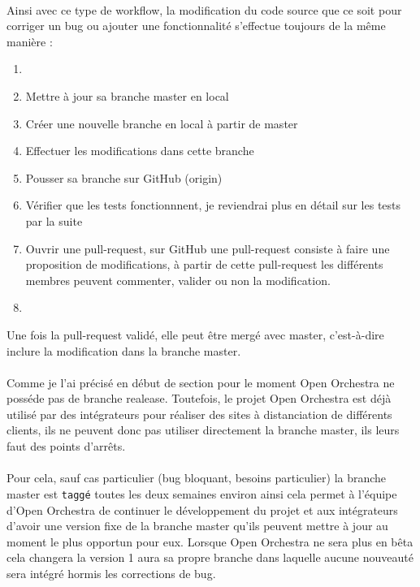 \paragraph{}
Ainsi avec ce type de workflow, la modification du code source que ce soit pour corriger un bug ou ajouter une fonctionnalité s'effectue toujours de la même manière : 
\begin{enumerate}
\item[]
\item Mettre à jour sa branche master en local
\item Créer une nouvelle branche en local à partir de master
\item Effectuer les modifications dans cette branche
\item Pousser sa branche sur GitHub (origin)
\item Vérifier que les tests fonctionnnent, je reviendrai plus en détail sur les tests par la suite
\item Ouvrir une pull-request, sur GitHub une pull-request consiste à faire une proposition de modifications, à partir de cette pull-request les différents membres peuvent commenter, valider ou non la modification.
         \item[]
\end{enumerate}

Une fois la pull-request validé, elle peut être mergé avec master, c'est-à-dire inclure la modification dans la branche master.
\paragraph{}
Comme je l'ai précisé en début de section pour le moment Open Orchestra ne posséde pas de branche realease. Toutefois, le projet Open Orchestra est déjà utilisé par des intégrateurs pour réaliser des sites à distanciation de différents clients, ils ne peuvent donc pas utiliser directement la branche master, ils leurs faut des points d'arrêts. 

\paragraph{}
Pour cela, sauf cas particulier (bug bloquant, besoins particulier) la branche master est \verb?taggé? toutes les deux semaines environ ainsi cela permet à l'équipe d'Open Orchestra de continuer le développement  du projet et aux intégrateurs d'avoir une version fixe de la branche master qu'ils peuvent mettre à jour au moment le plus opportun pour eux.  Lorsque Open Orchestra ne sera plus en bêta cela changera la version 1 aura sa propre branche dans laquelle aucune nouveauté sera intégré hormis les corrections de bug.

